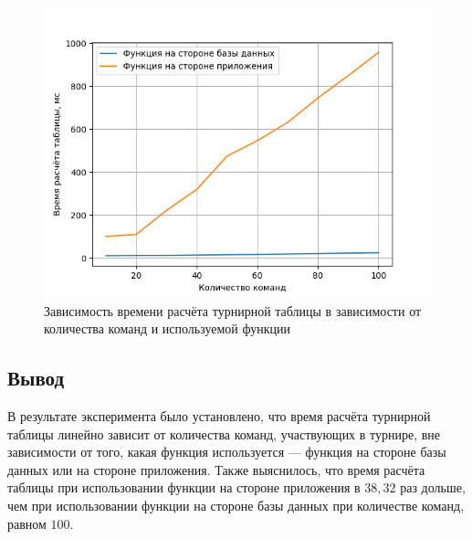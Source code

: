 \begin{figure}
  \centering
  \includegraphics[scale=1]{inc/research.png}
  \caption{Зависимость времени расчёта турнирной таблицы в зависимости от количества команд и используемой функции}
  \label{img:research}
\end{figure}

\subsection*{Вывод}
В результате эксперимента было установлено, что время расчёта турнирной таблицы линейно зависит от количества команд, участвующих в турнире, вне зависимости от того, какая функция используется --- функция на стороне базы данных или на стороне приложения. Также выяснилось, что время расчёта таблицы при использовании функции на стороне приложения в $38,32$ раз дольше, чем при использовании функции на стороне базы данных при количестве команд, равном $100$.